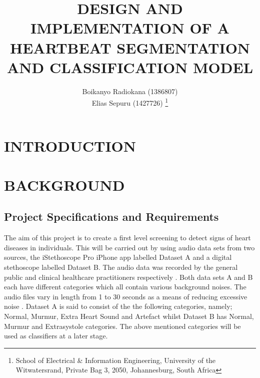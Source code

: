 \documentclass[10pt,twocolumn]{witseiepaper}
\begin{document}
\title{DESIGN AND IMPLEMENTATION OF A HEARTBEAT SEGMENTATION AND CLASSIFICATION MODEL}

\author{Boikanyo Radiokana (1386807) \\ Elias Sepuru (1427726)
\thanks{School of Electrical \& Information Engineering, University of the
Witwatersrand, Private Bag 3, 2050, Johannesburg, South Africa}
}


%



\maketitle
\thispagestyle{empty}\pagestyle{empty}


%
\section{INTRODUCTION}

\section{BACKGROUND}

%
\subsection{Project Specifications and Requirements}
\label{PSR}
The aim of this project is to create a first level screening to detect signs of heart diseases in individuals. This will be carried out by using audio data sets from two sources, the iStethoscope Pro iPhone app labelled Dataset A and a digital stethoscope labelled Dataset B. The audio data was recorded by the general public and clinical healthcare practitioners respectively \cite{pascal}. Both data sets A and B each have different categories which all contain various background noises. The audio files vary in length from 1 to 30 seconds as a means of reducing excessive noise \cite{pascal}. Dataset A is said to consist of the the following categories, namely; Normal, Murmur, Extra Heart Sound and Artefact whilst Dataset B has Normal, Murmur and Extrasystole categories. The above mentioned categories will be used as classifiers at a later stage.
\end{document}
